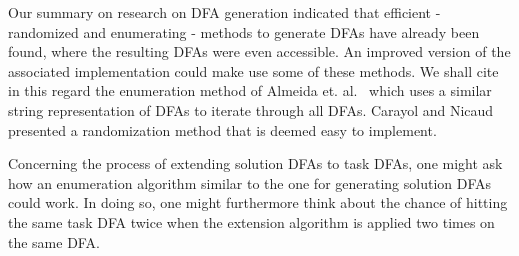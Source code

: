 Our summary on research on DFA generation indicated that efficient - randomized and enumerating - methods to generate DFAs have already been found, where the resulting DFAs were even accessible. An improved version of the associated implementation could make use some of these methods. We shall cite in this regard the enumeration method of Almeida et. al.~\cite{AAA09} which uses a similar string representation of DFAs to iterate through all DFAs. Carayol and Nicaud~\cite{CN12} presented a randomization method that is deemed easy to implement.

Concerning the process of extending solution DFAs to task DFAs, one might ask how an enumeration algorithm similar to the one for generating solution DFAs could work. In doing so, one might furthermore think about the chance of hitting the same task DFA twice when the extension algorithm is applied two times on the same DFA.
